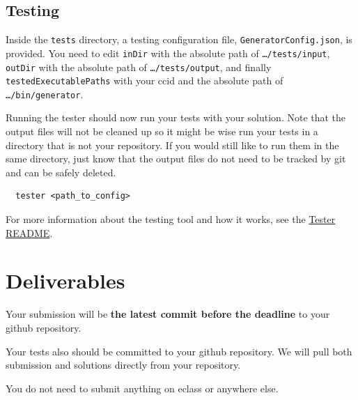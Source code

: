 \documentclass{article}
\newcommand{\code}[1]{\texttt{\textmd{#1}}}
\begin{document}
\subsection{Testing}
Inside the \code{tests} directory, a testing configuration file, \code{GeneratorConfig.json}, is
provided. You need to edit \code{inDir} with the absolute path of \code{\ldots/tests/input},
\code{outDir} with the absolute path of \code{\ldots/tests/output}, and finally
\code{testedExecutablePaths} with your ccid and the absolute path of \code{\ldots/bin/generator}.

Running the tester should now run your tests with your solution. Note that the output files will
not be cleaned up so it might be wise run your tests in a directory that is not your repository. If
you would still like to run them in the same directory, just know that the output files do not need
to be tracked by git and can be safely deleted.
\begin{lstlisting}
  tester <path_to_config>
\end{lstlisting}

For more information about the testing tool and how it works, see the
\href{https://github.com/cmput415/Tester/blob/master/README.md}{Tester README}.

\section{Deliverables}
Your submission will be \textbf{the latest commit before the deadline} to your github repository.

Your tests also should be committed to your github repository. We will pull both submission and
solutions directly from your repository.

You do not need to submit anything on eclass or anywhere else.
\end{document}
